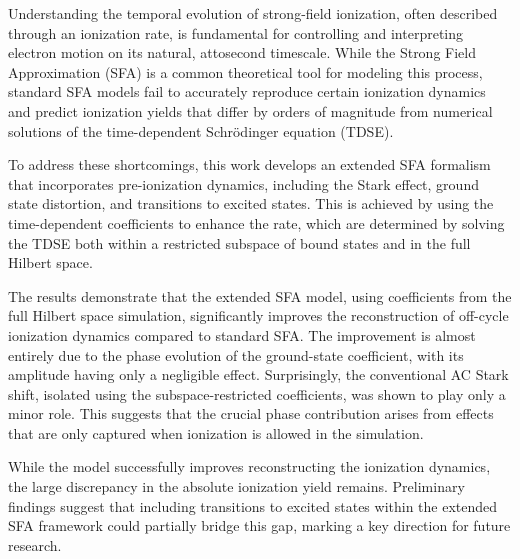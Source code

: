 Understanding the temporal evolution of strong-field ionization, often described through an ionization rate, is fundamental for controlling and interpreting electron motion on its natural, attosecond timescale.
While the Strong Field Approximation (SFA) is a common theoretical tool for modeling this process, standard SFA models fail to accurately reproduce certain ionization dynamics and predict ionization yields that differ by orders of magnitude from numerical solutions of the time-dependent Schrödinger equation (TDSE).

To address these shortcomings, this work develops an extended SFA formalism that incorporates pre-ionization dynamics, including the Stark effect, ground state distortion, and transitions to excited states. This is achieved by using the time-dependent coefficients to enhance the rate, which are determined by solving the TDSE both within a restricted subspace of bound states and in the full Hilbert space.

The results demonstrate that the extended SFA model, using coefficients from the full Hilbert space simulation, significantly improves the reconstruction of off-cycle ionization dynamics compared to standard SFA. The improvement is almost entirely due to the phase evolution of the ground-state coefficient, with its amplitude having only a negligible effect. Surprisingly, the conventional AC Stark shift, isolated using the subspace-restricted coefficients, was shown to play only a minor role. This suggests that the crucial phase contribution arises from effects that are only captured when ionization is allowed in the simulation.

While the model successfully improves reconstructing the ionization dynamics, the large discrepancy in the absolute ionization yield remains. Preliminary findings suggest that including transitions to excited states within the extended SFA framework could partially bridge this gap, marking a key direction for future research.